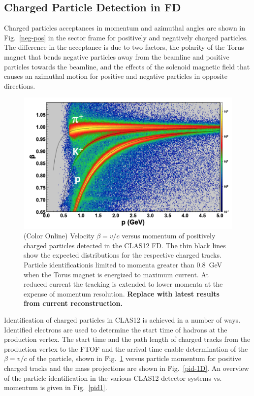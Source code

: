 \documentclass[final,3p,twocolumn]{elsarticle}
\begin{document}
\subsection{Charged Particle Detection in FD}
 
Charged particles acceptances in momentum and azimuthal angles are shown in Fig.~\ref{neg-pos} in the sector
frame for positively and negatively charged particles. The difference in the acceptance is due to two factors, the
polarity of the Torus magnet that bends negative particles away from the beamline and positive particles towards
the beamline, and the effects of the solenoid magnetic field that causes an azimuthal motion for positive and negative
particles in opposite directions. 

\begin{figure}[htbp!]
\centerline{\includegraphics[width=1.1\columnwidth]{FTOF1b_pid.png}}
\caption{(Color Online) Velocity $\beta = v/c $ versus momentum of positively charged particles detected in the CLAS12 FD. The
thin black lines show the expected distributions for the respective charged tracks. Particle identificationis limited
to momenta greater than 0.8~GeV when the Torus magnet is energized to maximum current. At reduced current the
tracking is extended to lower momenta at the expense of momentum resolution. {\bf Replace with latest results
from current reconstruction.}}
\label{pid}
\end{figure} 

Identification of charged particles in CLAS12 is achieved in a number of ways. Identified electrons are used to
determine the start time of hadrons at the production vertex. The start time and the path length of charged tracks
from the production vertex to the FTOF and the arrival time enable determination of the $\beta = v/c$ of the
particle, shown in Fig.~\ref{pid} versus particle momentum for positive charged tracks and the mass projections are
shown in Fig.~\ref{pid-1D}.  An overview of the particle identification in the various CLAS12 detector systems vs.
momentum is given in Fig.~\ref{pid1}. 
\end{document}
